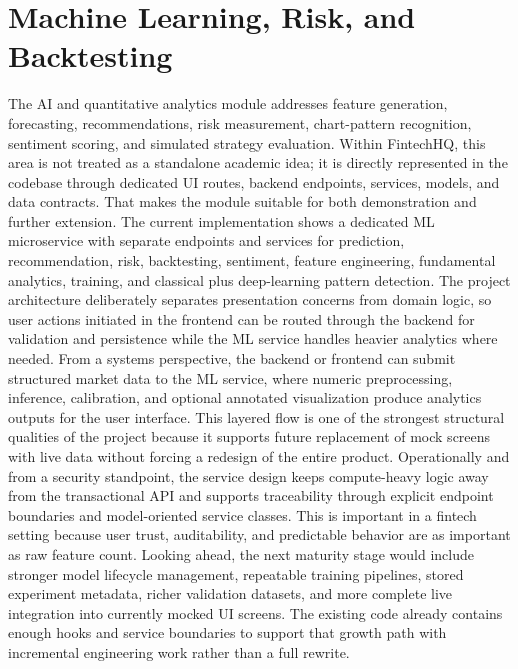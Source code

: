 \documentclass[11pt,a4paper]{article}
\begin{document}
\section{Machine Learning, Risk, and Backtesting}
The AI and quantitative analytics module addresses feature generation, forecasting, recommendations, risk measurement, chart-pattern recognition, sentiment scoring, and simulated strategy evaluation. Within FintechHQ, this area is not treated as a standalone academic idea; it is directly represented in the codebase through dedicated UI routes, backend endpoints, services, models, and data contracts. That makes the module suitable for both demonstration and further extension. The current implementation shows a dedicated ML microservice with separate endpoints and services for prediction, recommendation, risk, backtesting, sentiment, feature engineering, fundamental analytics, training, and classical plus deep-learning pattern detection. The project architecture deliberately separates presentation concerns from domain logic, so user actions initiated in the frontend can be routed through the backend for validation and persistence while the ML service handles heavier analytics where needed. From a systems perspective, the backend or frontend can submit structured market data to the ML service, where numeric preprocessing, inference, calibration, and optional annotated visualization produce analytics outputs for the user interface. This layered flow is one of the strongest structural qualities of the project because it supports future replacement of mock screens with live data without forcing a redesign of the entire product. Operationally and from a security standpoint, the service design keeps compute-heavy logic away from the transactional API and supports traceability through explicit endpoint boundaries and model-oriented service classes. This is important in a fintech setting because user trust, auditability, and predictable behavior are as important as raw feature count. Looking ahead, the next maturity stage would include stronger model lifecycle management, repeatable training pipelines, stored experiment metadata, richer validation datasets, and more complete live integration into currently mocked UI screens. The existing code already contains enough hooks and service boundaries to support that growth path with incremental engineering work rather than a full rewrite.
\end{document}
